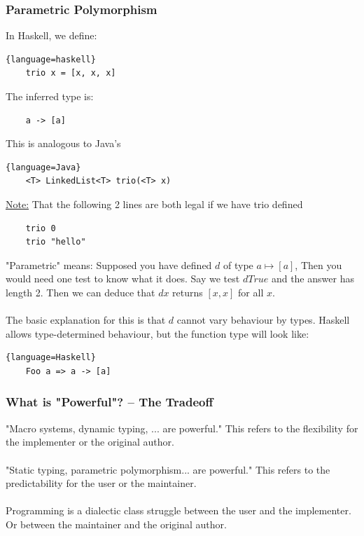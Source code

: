 \documentclass[12pt]{article}
\begin{document}
\subsubsection{Parametric Polymorphism}

In Haskell, we define:

\begin{lstlisting}{language=haskell}
    trio x = [x, x, x]
\end{lstlisting}
The inferred type is:
\begin{lstlisting}
    a -> [a]
\end{lstlisting}
This is analogous to Java's
\begin{lstlisting}{language=Java}
    <T> LinkedList<T> trio(<T> x)
\end{lstlisting}

\underline{Note:} That the following 2 lines are both legal if we have trio defined
\begin{lstlisting}
    trio 0
    trio "hello"
\end{lstlisting}

"Parametric" means:
Supposed you have defined $d$ of type $a \mapsto [a]$, Then you would need one test to know what it does. Say we test $d True$ and the answer has length 2. Then we can deduce that $d x$ returns $[x,x]$ for all $x$.\\
\\
The basic explanation for this is that $d$ cannot vary behaviour by types. Haskell allows type-determined behaviour, but the function type will look like:
\begin{lstlisting}{language=Haskell}
    Foo a => a -> [a]
\end{lstlisting}

\subsubsection{What is "Powerful"? -- The Tradeoff}

"Macro systems, dynamic typing, ... are powerful." This refers to the flexibility for the implementer or the original author.\\
\\
"Static typing, parametric polymorphism... are powerful." This refers to the predictability for the user or the maintainer.\\
\\
Programming is a dialectic class struggle between the user and the implementer. Or between the maintainer and the original author.
\end{document}
